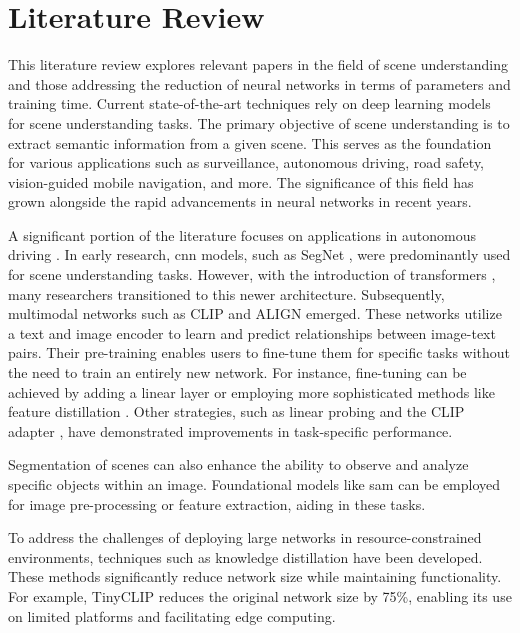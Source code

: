 \chapter{Literature Review}

This literature review explores relevant papers in the field of scene understanding and those addressing the reduction of neural networks in terms of parameters and training time.  
Current state-of-the-art techniques rely on deep learning models for scene understanding tasks.  
The primary objective of scene understanding is to extract semantic information from a given scene.  
This serves as the foundation for various applications such as surveillance, autonomous driving, road safety, vision-guided mobile navigation, and more.  
The significance of this field has grown alongside the rapid advancements in neural networks in recent years.  

A significant portion of the literature focuses on applications in autonomous driving \cite{sceneunderstandingautdriving1}.  
In early research, \acrfull{cnn} models, such as SegNet \cite{SegNet}, were predominantly used for scene understanding tasks.  
However, with the introduction of transformers \cite{attentionisallyouneed}, many researchers transitioned to this newer architecture.  
Subsequently, multimodal networks such as CLIP \cite{clip} and ALIGN \cite{ALIGN} emerged.  
These networks utilize a text and image encoder to learn and predict relationships between image-text pairs.  
Their pre-training enables users to fine-tune them for specific tasks without the need to train an entirely new network.  
For instance, fine-tuning can be achieved by adding a linear layer or employing more sophisticated methods like feature distillation \cite{finetuneclip}.  
Other strategies, such as linear probing \cite{linearprobeclip} and the CLIP adapter \cite{clipadapter}, have demonstrated improvements in task-specific performance.  

Segmentation of scenes can also enhance the ability to observe and analyze specific objects within an image.  
Foundational models like \acrfull{sam} \cite{sam} can be employed for image pre-processing or feature extraction, aiding in these tasks.  

To address the challenges of deploying large networks in resource-constrained environments, techniques such as knowledge distillation have been developed.  
These methods significantly reduce network size while maintaining functionality.  
For example, TinyCLIP \cite{tinyclip} reduces the original network size by 75\%, enabling its use on limited platforms and facilitating edge computing.  
